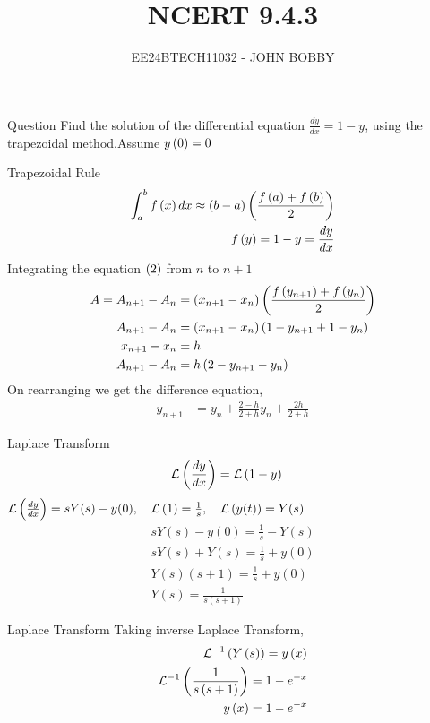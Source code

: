 \documentclass{beamer}
\begin{document}
\title{NCERT 9.4.3}
\author{EE24BTECH11032 - JOHN BOBBY}
\date{}
\frame{\titlepage}
\begin{frame}{Question}
    Find the solution of the differential equation $\frac{dy}{dx}=1-y$, using the trapezoidal method.Assume $y\left(0\right)=0$
\end{frame}
\begin{frame}{Trapezoidal Rule}
\begin{align}
    \int_{a}^{b} f\left(x\right)dx \approx \left(b-a\right)\left(\frac{f\left(a\right)+f\left(b\right)}{2}\right)\\
f\left(y\right)=1-y=\frac{dy}{dx}
\end{align}
Integrating the equation $\left(2\right)$ from $n$ to $n+1$
\begin{align}
    A=A_{n+1}-A_n&=\left(x_{n+1}-x_n\right)\left(\frac{f\left(y_{n+1}\right)+f\left(y_n\right)}{2}\right)\\
    A_{n+1}-A_n&=\left(x_{n+1}-x_n\right)\left(1-y_{n+1}+1-y_n\right)\\
    x_{n+1}-x_n&=h\\
    A_{n+1}-A_n&=h\left(2-y_{n+1}-y_n\right)
\end{align}
On rearranging we get the difference equation,
\begin{align}
    y_{n+1}&=y_n+\frac{2-h}{2+h}y_n+\frac{2h}{2+h}
\end{align}
\end{frame}
\begin{frame}{Laplace Transform}
\begin{align}
    \mathcal{L}\left(\frac{dy}{dx}\right) &= \mathcal{L}\left(1 - y\right)
\end{align}
    $\mathcal{L}\left(\frac{dy}{dx}\right) = sY(s) - y(0), \quad \mathcal{L}\left(1\right) = \frac{1}{s}, \quad \mathcal{L}\left(y(t)\right) = Y(s)$
\begin{align}
     sY(s) - y(0) = \frac{1}{s} - Y(s)\\
    sY(s) + Y(s) = \frac{1}{s} + y(0)\\
    Y(s)(s + 1) = \frac{1}{s} + y(0)\\
     Y(s) = \frac{1}{s(s+1)}
\end{align}


    
\end{frame}
\begin{frame}{Laplace Transform}
     Taking inverse Laplace Transform,
 \begin{align}
     \mathcal{L}^{-1}\left(Y\left(s\right)\right)=y\left(x\right)\\
    \mathcal{L}^{-1}\left(\frac{1}{s\left(s+1\right)}\right)=1-e^{-x}\\
    y\left(x\right)=1-e^{-x}
 \end{align}
\end{frame}
\end{document}
